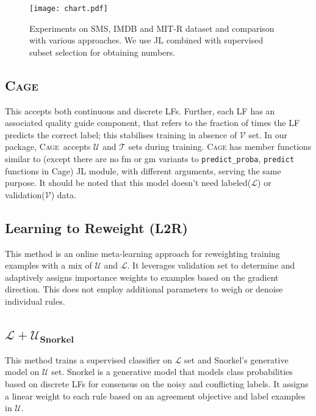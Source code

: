 \documentclass[11pt]{article}
\newcommand{\Ucal}{\mathcal{U}}
\newcommand{\Lcal}{\mathcal{L}}
\newcommand{\Vcal}{\mathcal{V}}
\newcommand{\Tcal}{\mathcal{T}}
\newcommand{\cage} {\textsc{Cage}}
\begin{document}
\begin{figure*}[t]
    \centering
    \texttt{[image: chart.pdf]}
    \caption{Experiments on SMS, IMDB and MIT-R dataset and comparison with various approaches. We use JL combined with supervised subset selection for obtaining numbers. }
    \label{fig:chart}
\end{figure*}

\subsection{\cage~\citep{oishik}}
This accepts both continuous and discrete LFs. Further, each LF has an associated quality guide component, that refers to the fraction of times the LF predicts the correct label; this stabilises training in absence of $\Vcal$ set. In our package, \cage\ accepts $\Ucal$ and $\Tcal$ sets during training. \cage{} has member functions similar to (except there are no fm or gm variants to \texttt{predict\_proba}, \texttt{predict} functions in Cage) JL module, with different arguments, serving the same purpose. It should be noted that this model doesn't need labeled($\Lcal$) or validation($\Vcal$) data.  %

\subsection{Learning to Reweight (L2R) \citep{l2r}}
This method is an online meta-learning approach for reweighting training examples with a mix of $\Ucal$ and $\Lcal$. It leverages validation set to determine and adaptively assigns importance weights to examples based on the gradient direction. This does not employ additional parameters to weigh or denoise individual rules.

\subsection{$\mathbf{\Lcal+\Ucal_{Snorkel}}$~\citep{ratner2017snorkel}} 

This method trains a supervised classifier on $\Lcal$ set and Snorkel's generative model on $\Ucal$ set. Snorkel is a generative model that models class probabilities based on discrete LFs for consensus on the noisy and conflicting labels. It assigns a linear weight to each rule based on an agreement objective and label examples in $\Ucal$.
\end{document}
